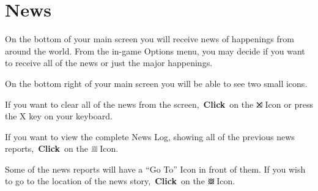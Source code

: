 \section{News}

On the bottom of your main screen you will receive news of happenings from around the world. From the in-game Options menu, you may decide if you want to receive all of the news or just the major happenings.

On the bottom right of your main screen you will be able to see two small icons.

If you want to clear all of the news from the screen, \textbf{Click} on the \includegraphics[width=0.02\linewidth]{Bx} Icon or press the X key on your keyboard.

If you want to view the complete News Log, showing all of the previous news reports, \textbf{Click} on the \includegraphics[width=0.02\linewidth]{Bnews} Icon.

Some of the news reports will have a “Go To” Icon in front of them. If you wish to go to the location of the news story, \textbf{Click} on the \includegraphics[width=0.02\linewidth]{Bgoto} Icon.